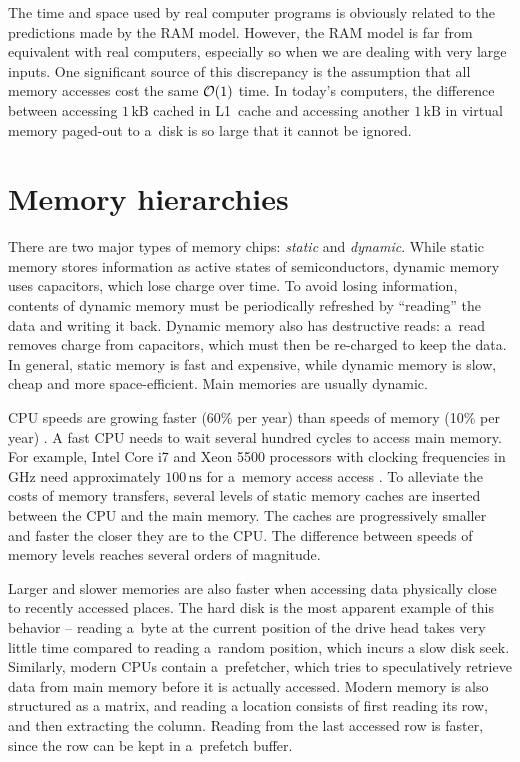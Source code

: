 The time and space used by real computer programs is obviously related
to the predictions made by the RAM model. However, the RAM model is far
from equivalent with real computers, especially so when we are dealing with
very large inputs. One significant source of this discrepancy is the assumption
that all memory accesses cost the same $\mathcal{O}(1)$ time. In today's computers,
the difference between accessing $1\,\text{kB}$ cached in L1~cache and
accessing another $1\,\text{kB}$ in virtual memory paged-out to a~disk is so
large that it cannot be ignored.

\section{Memory hierarchies}
There are two major types of memory chips: \emph{static} and \emph{dynamic}.
While static memory stores information as active states of semiconductors,
dynamic memory uses capacitors, which lose charge over time. To avoid losing
information, contents of dynamic memory must be periodically refreshed by
``reading'' the data and writing it back. Dynamic memory also has destructive
reads: a~read removes charge from capacitors, which must then be re-charged
to keep the data. In general, static memory is fast and expensive, while dynamic
memory is slow, cheap and more space-efficient. Main memories are usually
dynamic.

CPU speeds are growing faster (60\% per year) than speeds of memory (10\% per
year) \cite{Ailamaki:2004:DAN:1316689.1316801}.
A fast CPU needs to wait several hundred cycles to access main memory.
For example, Intel Core i7 and Xeon 5500 processors with clocking frequencies
in GHz need approximately $100\,\text{ns}$ for a~memory access
access \cite{perf-analysis-guide}.
To alleviate the costs of memory transfers, several levels of static memory
caches are inserted between the CPU and the main memory. The caches are
progressively smaller and faster the closer they are to the CPU. The difference
between speeds of memory levels reaches several orders of magnitude.

Larger and slower memories are also faster when accessing data physically
close to recently accessed places. The hard disk is the most apparent example
of this behavior -- reading a~byte at the current position of the drive
head takes very little time compared to reading a~random position, which incurs
a slow disk seek. %
Similarly, modern CPUs contain a~prefetcher, which tries to speculatively
retrieve data from main memory before it is actually accessed.
Modern memory is also structured as a matrix, and reading a location consists
of first reading its row, and then extracting the column. Reading from the last
accessed row is faster, since the row can be kept in a~prefetch buffer.

